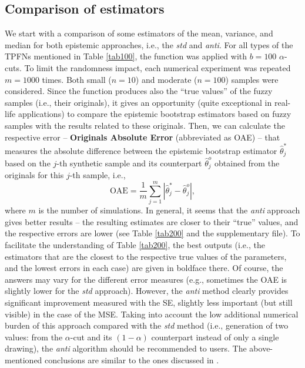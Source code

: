 \subsection{Comparison of estimators}
We start with a comparison of some estimators of the mean, variance, and median for both epistemic approaches, i.e., the \emph{std} and \emph{anti}.
For all types of the TPFNs mentioned in Table \ref{tab100}, the function  was applied with $b=100$ $\alpha$-cuts.
To limit the randomness impact, each numerical experiment was repeated $m=1000$ times.
Both small ($n=10$) and moderate ($n=100$) samples were considered.
Since the function  produces also the ``true values'' of the fuzzy samples (i.e., their originals), it gives an opportunity (quite exceptional in real-life applications) to compare the epistemic bootstrap estimators based on fuzzy samples with the results related to these originals.
Then, we can calculate the respective error -- \textbf{Originals Absolute Error} (abbreviated as OAE) -- that measures the absolute difference between the epistemic bootstrap estimator $\hat{\theta}^*_{j}$ based on the $j$-th synthetic sample and its counterpart $\hat{\theta}^o_{j}$ obtained from the originals for this $j$-th sample, i.e.,
\begin{equation}
    \text{OAE} = \frac{1}{m}\sum_{j=1}^{m} \left | \hat{\theta}^*_{j} - \hat{\theta}^o_{j} \right | ,
\end{equation}
where $m$ is the number of simulations.
In general, it seems that the \emph{anti} approach gives better results -- the resulting estimates are closer to their ``true'' values, and the respective errors are lower (see Table \ref{tab200} and the supplementary file).
To facilitate the understanding of Table \ref{tab200}, the best outputs (i.e., the estimators that are the closest to the respective true values of the parameters, and the lowest errors in each case) are given in boldface there.
Of course, the answers may vary for the different error measures (e.g., sometimes the OAE is slightly lower for the \emph{std} approach).
However, the \emph{anti} method clearly provides significant improvement measured with the SE, slightly less important (but still visible) in the case of the MSE.
Taking into account the low additional numerical burden of this approach compared with the \emph{std} method (i.e., generation of two values: from the $\alpha$-cut and its $(1-\alpha)$ counterpart instead of only a single drawing), the \emph{anti} algorithm should be recommended to users.
The above-mentioned conclusions are similar to the ones discussed in \cite{grzegorzewski2021,pgmr2022}.
